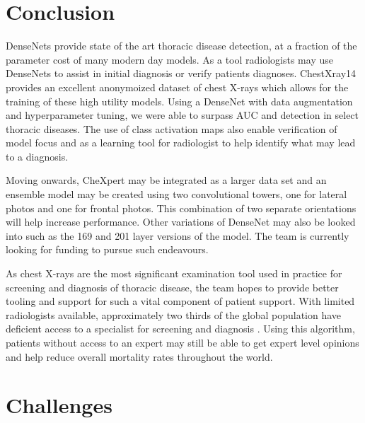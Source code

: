\documentclass{amia}
\begin{document}
\section*{Conclusion}
DenseNets provide state of the art thoracic disease detection, at a fraction of the parameter cost of many modern day models. As a tool radiologists may use DenseNets to assist in initial diagnosis or verify patients diagnoses. ChestXray14 provides an excellent anonymoized dataset of chest X-rays which allows for the training of these high utility models. Using a DenseNet with data augmentation and hyperparameter tuning, we were able to surpass AUC and detection in select thoracic diseases. The use of class activation maps also enable verification of model focus and as a learning tool for radiologist to help identify what may lead to a diagnosis.

Moving onwards, CheXpert may be integrated as a larger data set and an ensemble model may be created using two convolutional towers, one for lateral photos and one for frontal photos. This combination of two separate orientations will help increase performance. Other variations of DenseNet may also be looked into such as the 169 and 201 layer versions of the model. The team is currently looking for funding to pursue such endeavours.

As chest X-rays are the most significant examination tool used in practice for screening and diagnosis of thoracic disease, the team hopes to provide better tooling and support for such a vital component of patient support. With limited radiologists available, approximately two thirds of the global population have deficient access to a specialist for screening and diagnosis \cite{ref16}. Using this algorithm, patients without access to an expert may still be able to get expert level opinions and help reduce overall mortality rates throughout the world.

\pagebreak

\section*{Challenges}
\end{document}
